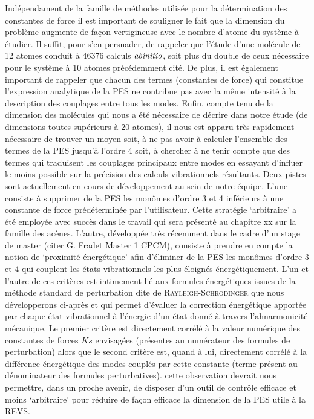 Indépendament de la famille de méthodes utilisée pour la détermination des constantes de force il est important de souligner le fait que la dimension du problème augmente de façon vertigineuse avec le nombre d’atome du système à étudier. Il suffit, pour s’en persuader, de rappeler que l’étude d’une molécule de 12 atomes conduit à 46376 calculs $\it{ab initio}$, soit plus du double de ceux nécessaire pour le système à 10 atomes précédemment cité. De plus, il est également important de rappeler que chacun des termes (constantes de force) qui constitue l’expression analytique de la PES ne contribue pas avec la même intensité à la description des couplages entre tous les modes. Enfin, compte tenu de la dimension des molécules qui nous a été nécessaire de décrire dans notre étude (de dimensions toutes supérieurs à 20 atomes), il nous est apparu très rapidement nécessaire de trouver un moyen soit, à ne pas avoir à calculer l’ensemble des termes de la PES jusqu’à l’ordre 4 soit, à chercher à ne tenir compte que des termes qui traduisent les couplages principaux entre modes en essayant d’influer le moins possible sur la précision des calculs vibrationnels résultants. Deux pistes sont actuellement en cours de développement au sein de  notre équipe. L’une consiste à supprimer de la PES les monômes d’ordre 3 et 4 inférieurs à une constante de force prédéterminée par l’utilisateur. Cette stratégie ‘arbitraire’ a été employée avec succès dans le travail qui sera présenté au chapitre xx sur la famille des acènes. L’autre, développée très récemment dans le cadre d’un stage de master (citer G. Fradet Master 1 CPCM), consiste à prendre en compte la notion de ‘proximité énergétique’ afin d’éliminer de la PES les monômes d’ordre 3 et 4 qui couplent les états vibrationnels les plus éloignés énergétiquement. L’un et l’autre de ces critères est intimement lié aux formules énergétiques issues de la méthode standard de perturbation dite de \textsc{Rayleigh-Schrödinger} que nous développerons ci-après et qui permet d’évaluer la correction énergétique apportée par chaque état vibrationnel à l’énergie d’un état donné à travers l’ahnarmonicité mécanique. Le premier critère est directement corrélé à la valeur numérique des constantes de forces $Ks$ envisagées (présentes au numérateur des formules de perturbation) alors que le second critère est, quand à lui, directement corrélé à la différence énergétique des modes couplés par cette constante (terme présent au dénominateur des formules perturbatives). cette observation devrait nous permettre, dans un proche avenir, de disposer d’un outil de contrôle efficace et moins ‘arbitraire’ pour réduire de façon efficace la dimension de la PES utile à la REVS. 

